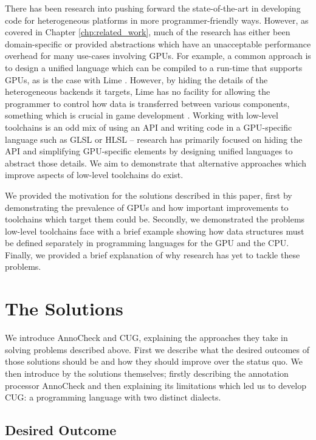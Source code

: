 \documentclass[a4paper,12pt,twoside,openright]{report}
\begin{document}
There has been research into pushing forward the state-of-the-art in developing
code for heterogeneous platforms in more programmer-friendly ways. However, as
covered in Chapter \ref{chp:related_work}, much of the research has either been
domain-specific or provided abstractions which have an unacceptable performance
overhead for many use-cases involving GPUs. For example, a common approach is
to design a unified language which can be compiled to a run-time that supports
GPUs, as is the case with Lime \cite{Lime2010}. However, by hiding the details
of the heterogeneous backends it targets, Lime has no facility for allowing the
programmer to control how data is transferred between various components,
something which is crucial in game development \cite{TODO}. Working with
low-level toolchains is an odd mix of using an API and writing code in a
GPU-specific language such as GLSL or HLSL -- research has primarily focused on
hiding the API and simplifying GPU-specific elements by designing unified
languages to abstract those details. We aim to demonstrate that alternative
approaches which improve aspects of low-level toolchains do exist.

We provided the motivation for the solutions described in this paper, first by
demonstrating the prevalence of GPUs and how important improvements to
toolchains which target them could be. Secondly, we demonstrated the problems
low-level toolchains face with a brief example showing how data structures must
be defined separately in programming languages for the GPU and the CPU.
Finally, we provided a brief explanation of why research has yet to tackle
these problems.

\section{The Solutions}

\label{sec:solutions_introduction}

We introduce AnnoCheck and CUG, explaining the approaches they take in solving
problems described above. First we describe what the desired outcomes of those
solutions should be and how they should improve over the status quo. We then
introduce by the solutions themselves; firstly describing the annotation
processor AnnoCheck and then explaining its limitations which led us to develop
CUG: a programming language with two distinct dialects.

\subsection{Desired Outcome}
\end{document}
